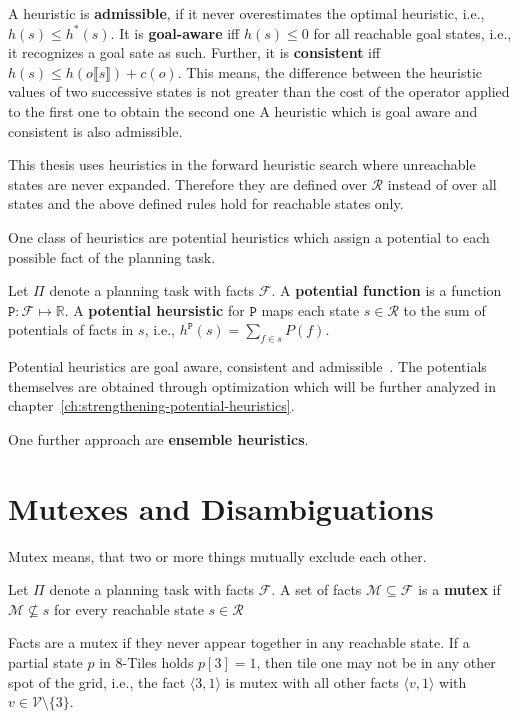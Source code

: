 A heuristic is \textbf{admissible}, if it never overestimates the optimal heuristic, i.e., $h(s)\leq h^*(s)$.
It is \textbf{goal-aware} iff $h(s)\leq 0$ for all reachable goal states, i.e., it recognizes a goal sate as such.
Further, it is \textbf{consistent} iff $h(s)\leq h(o\llbracket s\rrbracket)+c(o)$.
This means, the difference between the heuristic values of two successive states is not greater than the cost of the operator applied to the first one to obtain the second one
A heuristic which is goal aware and consistent is also admissible.

This thesis uses heuristics in the forward heuristic search where unreachable states are never expanded.
Therefore they are defined over $\mathcal{R}$ instead of over all states and the above defined rules hold for reachable states only.

One class of heuristics are potential heuristics which assign a potential to each possible fact of the planning task.
\begin{definition}
    Let $\Pi$ denote a planning task with facts $\mathcal{F}$.
    A \textbf{potential function} is a function $\mathtt{P}:\mathcal{F}\mapsto\mathbb{R}$.
    A \textbf{potential heursistic} for $\mathtt{P}$ maps each state $s\in\mathcal{R}$ to the sum of potentials of facts in $s$, i.e., $h^\mathtt{P}(s)=\sum_{f\in s}P(f)$.
\end{definition}

Potential heuristics are goal aware, consistent and admissible~\cite{fivser2020strengthening}.
The potentials themselves are obtained through optimization which will be further analyzed in chapter~\ref{ch:strengthening-potential-heuristics}.

One further approach are \textbf{ensemble heuristics}.

\section{Mutexes and Disambiguations}\label{sec:mutexes-and-disambiguations}
Mutex means, that two or more things mutually exclude each other.

\begin{definition}
    Let $\Pi$ denote a planning task with facts $\mathcal{F}$.
    A set of facts $\mathcal{M}\subseteq \mathcal{F}$ is a \textbf{mutex} if $\mathcal{M}\nsubseteq s$ for every reachable state $s\in\mathcal{R}$
\end{definition}

Facts are a mutex if they never appear together in any reachable state.
If a partial state $p$ in 8-Tiles holds $p[3]=1$, then tile one may not be in any other spot of the grid, i.e., the fact $\langle 3, 1\rangle$ is mutex with all
other facts $\langle v, 1\rangle$ with $v\in \mathcal{V}\setminus \{3\}$.

